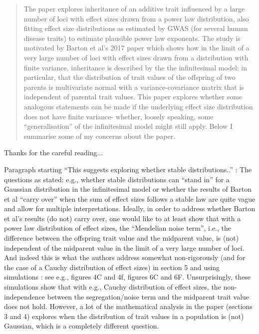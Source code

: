 
\begin{quote}
The paper explores inheritance of an additive trait influenced by a large number of loci with effect sizes drawn from a power law distribution, also fitting effect size distributions as estimated by GWAS (for several human disease traits) to estimate plausible power law exponents. The study is motivated by Barton et al's 2017 paper which shows how in the limit of a very large number of loci with effect sizes drawn from a distribution with finite variance, inheritance is described by the the infinitesimal model: in particular, that the distribution of trait values of the offspring of two parents is multivariate normal with a variance-covariance matrix that is independent of parental trait values. This paper explores whether some analogous statements can be made if the underlying effect size distribution does not have finite variance- whether, loosely speaking, some ``generalisation'' of the infinitesimal model might still apply. Below I summarise some of my concerns about the paper.
\end{quote}

Thanks for the careful reading...

\begin{point}{}
    Paragraph starting ``This suggests exploring whether stable distributions..'' \revref:
The questions as stated: e.g., whether stable distributions can ``stand in'' for a Gaussian distribution in the infinitesimal model or whether the results of Barton et al ``carry over'' when the sum of effect sizes follows a stable law are quite vague and allow for multiple interpretations. Ideally, in order to address whether Barton et al's results (do not) carry over, one would like to at least show that with a power law distribution of effect sizes, the ``Mendelian noise term'', i.e., the difference between the offspring trait value and the midparent value, is (not) independent of the midparent value in the limit of a very large number of loci. And indeed this is what the authors address
somewhat non-rigorously (and for the case of a Cauchy distribution of effect sizes) in section 5 and using simulations : see e.g., figures 4C and 4f, figures 6C and 6F. Unsurprisingly, these simulations show that with e.g., Cauchy distribution of effect sizes, the non-independence between the segregation/noise term and the midparent trait value does not hold. However, a lot of the mathematical analysis in the paper (sections 3 and 4) explores when the distribution of trait values in a population is (not) Gaussian, which is a completely different question.
\end{point}

